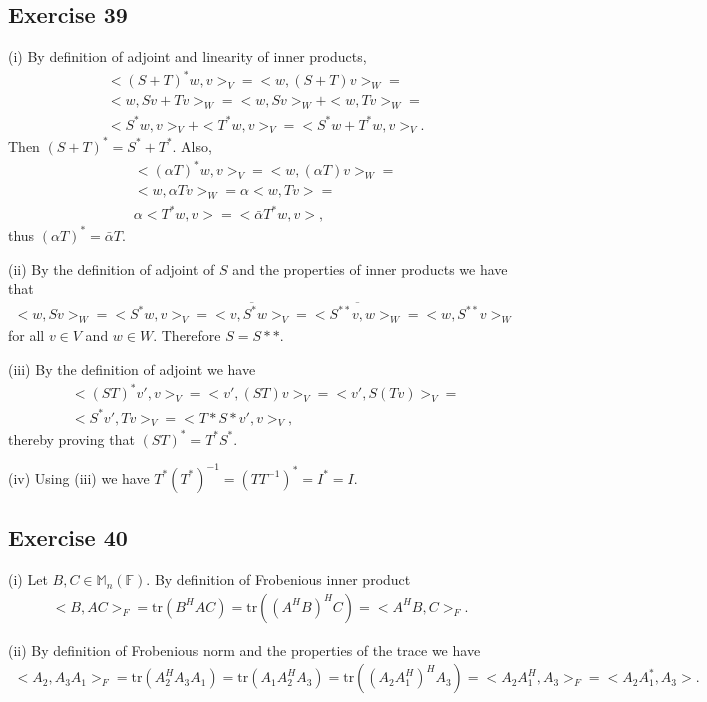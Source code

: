 \documentclass[11.5pt, letterpaper, bibtotoc,
    tablecaptionabove, figurecaptionabove]{article}
\begin{document}
\subsection*{Exercise 39}
(i)
By definition of adjoint and linearity of inner products,
\begin{align*}
    &<(S+T)^*w,v>_V=
    <w,(S+T)v>_W=\\
    &<w,Sv+Tv>_W=
    <w,Sv>_W+<w,Tv>_W=\\
    &<S^*w,v>_V + <T^*w,v>_V=
    <S^*w+T^*w,v>_V.
\end{align*}
Then $(S+T)^*=S^*+T^*$.
Also,
\begin{align*}
    &<(\alpha T)^*w,v>_V=
    <w,(\alpha T)v>_W=\\
    &<w,\alpha Tv>_W=
    \alpha<w, Tv>=\\
    &\alpha<T^*w,v>=
    <\bar{\alpha}T^*w,v>,
\end{align*}
thus $(\alpha T)^*=\bar{\alpha}T$.

(ii)
By the definition of adjoint of $S$ and the properties of inner products we have that
\begin{align*}
    <w,Sv>_W=<S^*w,v>_V=
    \overline{<v,S^*w>_V}=\overline{<S^{**}v,w>_W}=
    <w,S^{**}v>_W
\end{align*}
for all $v\in V$ and $w\in W$.
Therefore $S=S**$.

(iii)
By the definition of adjoint we have
\begin{align*}
    &<(ST)^*v',v>_V=<v',(ST)v>_V=<v',S(Tv)>_V=\\
    &<S^*v',Tv>_V=<T*S*v',v>_V,
\end{align*}
thereby proving that $(ST)^*=T^*S^*$.

(iv)
Using (iii) we have $T^*(T^*)^{-1}=(TT^{-1})^*=I^*=I$.

\subsection*{Exercise 40}
(i)
Let $B,C\in\mathbb M_n(\mathbb F)$.
By definition of Frobenious inner product
\begin{align*}
    <B,AC>_F=\text{tr}(B^HAC)=\text{tr}((A^HB)^HC)=<A^HB,C>_F.
\end{align*}

(ii)
By definition of Frobenious norm and the properties of the trace we have
\begin{align*}
    <A_2,A_3A_1>_F=\text{tr}(A_2^HA_3A_1)=
    \text{tr}(A_1A_2^HA_3)=\text{tr}((A_2A_1^H)^HA_3)=
    <A_2A_1^H,A_3>_F=<A_2A_1^*,A_3>.
\end{align*}
\end{document}

